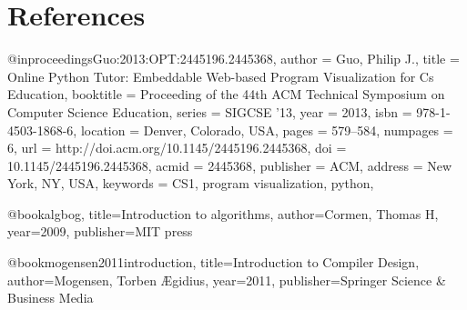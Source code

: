\documentclass[11pt]{article}
\begin{document}
\section*{References}
%
%

\begin{thebibliography}{9}
 
 

@inproceedings{Guo:2013:OPT:2445196.2445368,
 author = {Guo, Philip J.},
 title = {Online Python Tutor: Embeddable Web-based Program Visualization for Cs Education},
 booktitle = {Proceeding of the 44th ACM Technical Symposium on Computer Science Education},
 series = {SIGCSE '13},
 year = {2013},
 isbn = {978-1-4503-1868-6},
 location = {Denver, Colorado, USA},
 pages = {579--584},
 numpages = {6},
 url = {http://doi.acm.org/10.1145/2445196.2445368},
 doi = {10.1145/2445196.2445368},
 acmid = {2445368},
 publisher = {ACM},
 address = {New York, NY, USA},
 keywords = {CS1, program visualization, python},
} 

@book{algbog,
  title={Introduction to algorithms},
  author={Cormen, Thomas H},
  year={2009},
  publisher={MIT press}
}

@book{mogensen2011introduction,
  title={Introduction to Compiler Design},
  author={Mogensen, Torben {\AE}gidius},
  year={2011},
  publisher={Springer Science \& Business Media}
}
\end{thebibliography}
\end{document}

